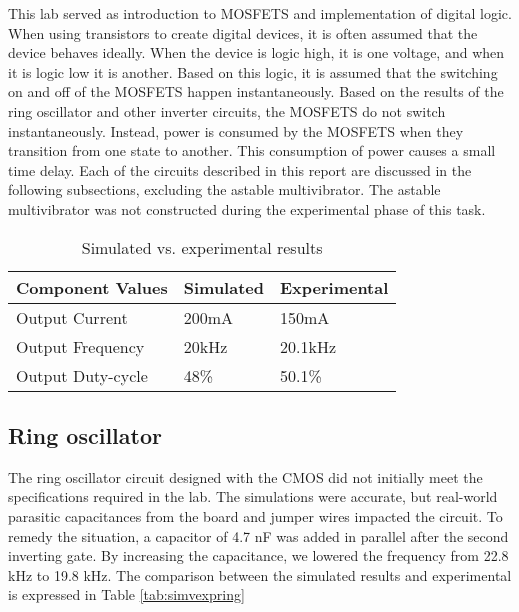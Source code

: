 

This lab served as introduction to MOSFETS and implementation of digital logic. When using transistors to create digital devices, it is often assumed that the device behaves ideally. When the device is logic high, it is one voltage, and when it is logic low it is another. Based on this logic, it is assumed that the switching on and off of the MOSFETS happen instantaneously. Based on the results of the ring oscillator and other inverter circuits, the MOSFETS do not switch instantaneously. Instead, power is consumed by the MOSFETS when they transition from one state to another. This consumption of power causes a small time delay. Each of the circuits described in this report are discussed in the following subsections, excluding the astable multivibrator. The astable multivibrator was not constructed during the experimental phase of this task.


\begin{table}[H]
	\centering
	\caption{Simulated vs. experimental results}
	\label{tab:simvsexp}
	\begin{tabular}{|l|l|l|}
		\hline
		Component Values  & Simulated & Experimental \\ \hline
		Output Current    & 200mA     & 150mA        \\ \hline
		Output Frequency  & 20kHz     & 20.1kHz      \\ \hline
		Output Duty-cycle & 48\%      & 50.1\%       \\ \hline
	\end{tabular}
\end{table}


\subsection{Ring oscillator}
The ring oscillator circuit designed with the CMOS did not initially meet the specifications required in the lab. The simulations were accurate, but real-world parasitic capacitances from the board and jumper wires impacted the circuit. To remedy the situation, a capacitor of 4.7 nF was added in parallel after the second inverting gate. By increasing the capacitance, we lowered
the frequency from 22.8 kHz to 19.8 kHz. The comparison between the simulated results and experimental is expressed in Table \ref{tab:simvexpring}

